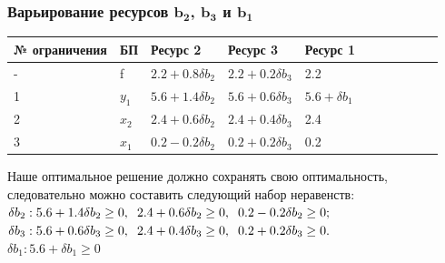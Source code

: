 \documentclass[14pt,a4paper,fleqn]{extarticle}
\begin{document}
\subsubsection*{Варьирование ресурсов $\boldsymbol{b_2}$, $\boldsymbol{b_3}$ и $\boldsymbol{b_1}$}
\begin{tabularx}{\textwidth}{V{1}p{3.15cm}V{1}p{0.75cm}V{1}p{3cm}V{1}p{3cm}V{6}p{2.95cm}V{1}}
	\hline
	\small № ограничения & БП & \small Ресурс 2 & \small Ресурс 3 & \small Ресурс 1\\
	\hline
	- & f & \small $2.2 + 0.8\delta b_2$ & \small $2.2 + 0.2\delta b_3$ & 2.2\\
	 & $y_1$ & \small $5.6 + 1.4 \delta b_2$ & \small $5.6 + 0.6 \delta b_3$ & \small $5.6 + \delta b_1$\\
	 & $x_2$ & \small $2.4 + 0.6 \delta b_2$ & \small $2.4 + 0.4 \delta b_3$ & 2.4\\
	 & $x_1$ & \small $0.2 - 0.2 \delta b_2$ & \small $0.2 + 0.2 \delta b_3$ & 0.2\\
	\hline
\end{tabularx}
\newline\newline
Наше оптимальное решение должно сохранять свою оптимальность, следовательно можно составить следующий набор неравенств:\\
$\delta b_2: 5.6 + 1.4 \delta b_2 \geq 0, \hspace*{0.2cm} 2.4 + 0.6 \delta b_2 \geq 0, \hspace*{0.2cm} 0.2 - 0.2 \delta b_2 \geq 0;$\\
$\delta b_3: 5.6 + 0.6 \delta b_3 \geq 0, \hspace*{0.2cm} 2.4 + 0.4 \delta b_3 \geq 0, \hspace*{0.2cm} 0.2 + 0.2 \delta b_3 \geq 0.$\\
$\delta b_1: 5.6 + \delta b_1 \geq 0$\\
\end{document}
